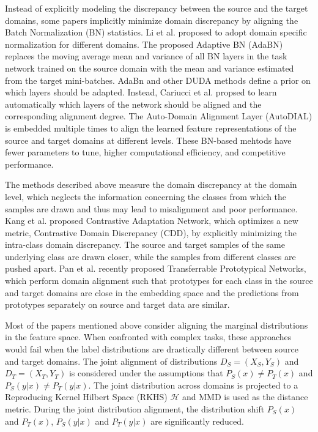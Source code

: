 \documentclass[conference]{IEEEtran}
\begin{document}
Instead of explicitly modeling the discrepancy between the source and the target domains,
some papers implicitly minimize domain discrepancy by aligning the Batch Normalization
(BN) statistics. 
Li et al. proposed to adopt domain specific normalization for different domains. 
The proposed Adaptive BN (AdaBN) replaces the moving average mean and variance
of all BN layers in the task network trained on the source domain with the mean and variance 
estimated from the target mini-batches. AdaBn and other DUDA methods define
a prior on which layers should be adapted. 
Instead, Cariucci et al. propsed to learn automatically which layers of the network should be 
aligned and the corresponding alignment degree. 
The Auto-Domain Alignment Layer (AutoDIAL) is embedded multiple times to 
align the learned feature representations of the source and target domains at 
different levels.
These BN-based mehtods have fewer parameters to tune, higher computational 
efficiency, and competitive performance.

The methods described above measure the domain discrepancy at the domain level, 
which neglects the information concerning the classes from which the samples are 
drawn and thus may lead to misalignment and poor performance. 
Kang et al. proposed Contrastive Adaptation Network, which optimizes a new 
metric, Contrastive Domain Discrepancy (CDD), by explicitly minimizing 
the intra-class domain discrepancy. 
The source and target samples of the same underlying class are drawn closer,
while the samples from different classes are pushed apart. 
Pan et al. recently proposed Transferrable Prototypical Networks, which 
perform domain alignment such that prototypes for each class in the source and 
target domains are close in the embedding space and the predictions from
prototypes separately on source and target data are similar.

Most of the papers mentioned above consider aligning the marginal distributions 
in the feature space. When confronted with complex tasks, 
these approaches would fail when the label distributions are drastically
different between source and target domains.
The joint alignment of distributions $D_S=(X_S, Y_S)$ and $D_T=(X_T, Y_T)$ is considered 
under the assumptions that $P_S(x) \neq P_T(x)$ and 
$P_S(y|x) \neq P_T(y|x)$. The joint distribution across domains is projected
to a Reproducing Kernel Hilbert Space (RKHS) $\mathcal{H}$ and MMD 
is used as the distance metric.
During the joint distribution alignment, the distribution shift $P_S(x)$
and $P_T(x)$, $P_S(y|x)$ and $P_T(y|x)$ are significantly reduced.
\end{document}
